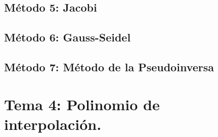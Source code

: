 \documentclass[10pt]{article}
\begin{document}
\UseRawInputEncoding

\newpage

\subsection{Método 5: Jacobi}

\UseRawInputEncoding


\newpage

\subsection{Método 6: Gauss-Seidel}

\UseRawInputEncoding


\newpage

\subsection{Método 7: Método de la Pseudoinversa}

\UseRawInputEncoding

\newpage


\section{Tema 4: Polinomio de interpolación.}
\end{document}
